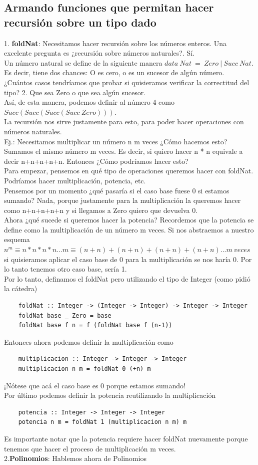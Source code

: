 \documentclass[10pt,a4paper]{article}
\begin{document}
\subsection*{Armando funciones que permitan hacer recursión sobre un tipo dado}
1. \textbf{foldNat}: Necesitamos hacer recursión sobre los números enteros. Una excelente pregunta es ¿recursión sobre números naturales?. Sí. \\
Un número natural se define de la siguiente manera $data \ Nat \ = \ Zero \ | \ Succ \ Nat$. Es decir, tiene dos chances: O es cero, o es un sucesor de algún número. \\
¿Cuántos casos tendríamos que probar si quisieramos verificar la correctitud del tipo? 2. Que sea Zero o que sea algún sucesor. \\
Así, de esta manera, podemos definir al número 4 como $Succ(Succ(Succ(Succ  \ Zero)))$. \\
La recursión nos sirve justamente para esto, para poder hacer operaciones con números naturales. \\
Ej.: Necesitamos multiplicar un número n m veces ¿Cómo hacemos esto? Sumamos el mismo número m veces. Es decir, si quiero hacer n * n equivale a decir n+n+n+n+n. Entonces ¿Cómo podríamos hacer esto? \\
Para empezar, pensemos en qué tipo de operaciones queremos hacer con foldNat. Podríamos hacer multiplicación, potencia, etc. \\
Pensemos por un momento ¿qué pasaría si el caso base fuese 0 si estamos sumando? Nada, porque justamente para la multiplicación la queremos hacer como n+n+n+n+n y si llegamos a Zero quiero que devuelva 0. \\
Ahora ¿qué sucede si queremos hacer la potencia? Recordemos que la potencia se define como la multiplicación de un número m veces. Si nos abstraemos a nuestro esquema $n^{m} \equiv n * n * n * n ... m\equiv (n+n) + (n+n) + (n+n) + (n+n) ... m \ veces$ si quisieramos aplicar el caso base de 0 para la multiplicación se nos haría 0. Por lo tanto tenemos otro caso base, sería 1. \\
Por lo tanto, definamos el foldNat pero utilizando el tipo de Integer (como pidió la cátedra)
\begin{lstlisting}
    foldNat :: Integer -> (Integer -> Integer) -> Integer -> Integer
    foldNat base _ Zero = base 
    foldNat base f n = f (foldNat base f (n-1))
\end{lstlisting}
Entonces ahora podemos definir la multiplicación como 
\begin{lstlisting}
    multiplicacion :: Integer -> Integer -> Integer 
    multiplicacion n m = foldNat 0 (+n) m 
\end{lstlisting}
¡Nótese que acá el caso base es 0 porque estamos sumando! \\
Por último podemos definir la potencia reutilizando la multiplicación 
\begin{lstlisting}
    potencia :: Integer -> Integer -> Integer 
    potencia n m = foldNat 1 (multiplicacion n m) m
\end{lstlisting}
Es importante notar que la potencia requiere hacer foldNat nuevamente porque tenemos que hacer el proceso de multiplicación m veces. \\
2.\textbf{Polinomios}: Hablemos ahora de Polinomios 
\end{document}
